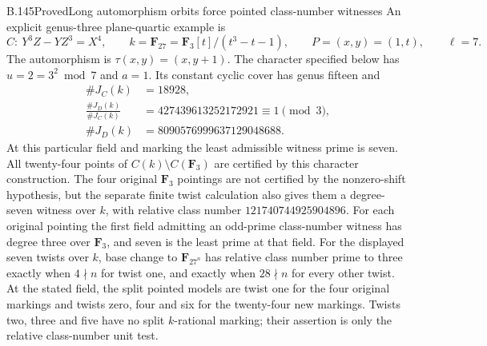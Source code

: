 \begin{claim}{B.145}{Proved}{Long automorphism orbits force pointed class-number witnesses}
An explicit genus-three plane-quartic example is
\[
 C:\ Y^3Z-YZ^3=X^4,\qquad
 k=\mathbf F_{27}=\mathbf F_3[t]/(t^3-t-1),\qquad
 P=(x,y)=(1,t),\qquad \ell=7 .
                                                            \tag{B.145.3}
\]
The automorphism is $\tau(x,y)=(x,y+1)$.
The character specified below has $u=2=3^2\bmod7$ and $a=1$.
Its constant cyclic cover has genus fifteen and
\[
\begin{split}
 \#J_C(k)&=18928,\\
 \frac{\#J_D(k)}{\#J_C(k)}&=427439613252172921
                                  \equiv1\pmod3,\\
 \#J_D(k)&=8090576999637129048688 .
\end{split}                                                   \tag{B.145.4}
\]
At this particular field and marking the least admissible
witness prime is seven.
All twenty-four points of $C(k)\setminus C(\mathbf F_3)$
are certified by this character construction.
The four original $\mathbf F_3$ pointings are not certified
by the nonzero-shift hypothesis, but the separate finite twist
calculation also gives them a degree-seven witness over $k$,
with relative class number $121740744925904896$.
For each original pointing the first field admitting an
odd-prime class-number witness has degree three over
$\mathbf F_3$, and seven is the least prime at that field.
For the displayed seven twists over $k$, base change to
$\mathbf F_{27^n}$ has relative class number prime to three
exactly when $4\nmid n$ for twist one, and exactly when
$28\nmid n$ for every other twist.
At the stated field, the split pointed models are twist one
for the four original markings and twists zero, four and six
for the twenty-four new markings.  Twists two, three and five
have no split $k$-rational marking; their assertion is only
the relative class-number unit test.
\end{claim}
